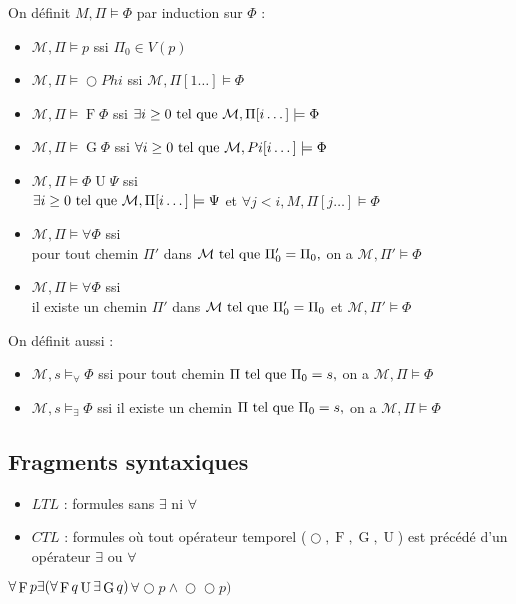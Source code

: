 \documentclass[10pt,a4paper]{article}
\newcommand{\M}{\mathcal{M}}
\DeclareMathOperator{\Oo}{\bigcirc}
\DeclareMathOperator{\Fo}{F}
\DeclareMathOperator{\Go}{G}
\DeclareMathOperator{\Uo}{U}
\begin{document}
\begin{definition}
 On définit $M, \Pi \models \Phi$ par induction sur $\Phi$ :
\begin{itemize}
 \item $\M, \Pi \models p$ ssi $\Pi_0 \in V(p)$
 \item $\M, \Pi \models  \Oo Phi$ ssi $\M, \Pi [ 1 \dots ] \models \Phi$
 \item $\M, \Pi \models \Fo \Phi$ ssi $\exists i \geq 0 \tq \M, \Pi [ i \dots ] \models \Phi$
 \item $\M, \Pi \models \Go \Phi$ ssi $\forall i \geq 0 \tq \M, Pi [ i \dots ] \models \Phi$
 \item $\M, \Pi \models \Phi \Uo \Psi$ ssi \\$\exists i \geq 0 \tq \M, \Pi [ i \dots ] \models \Psi$ et $\forall j < i, M, \Pi[j \dots] \models \Phi$
 \item $\M, \Pi \models \forall \Phi$ ssi \\pour tout chemin $\Pi'$ dans $\M \tq \Pi'_0 = \Pi_0,$ on a $\M, \Pi' \models \Phi$
 \item $\M, \Pi \models \forall \Phi$ ssi \\il existe un chemin $\Pi'$ dans $\M \tq \Pi'_0 = \Pi_0$ et $\M, \Pi' \models \Phi$
\end{itemize}
On définit aussi :
\begin{itemize}
 \item $\M, s \models_{\forall} \Phi$ ssi pour tout chemin $\Pi \text{ tel que } \Pi_0 = s,$ on a $\M, \Pi \models \Phi$
 \item $\M, s \models_{\exists} \Phi$ ssi il existe un chemin $\Pi \text{ tel que } \Pi_0 = s,$ on a $\M, \Pi \models \Phi$
\end{itemize}

\end{definition}

\subsection{Fragments syntaxiques}
\begin{itemize}
 \item $LTL$ : formules sans $\exists$ ni $\forall$
 \item $CTL$ : formules où tout opérateur temporel ($  \Oo, \Fo, \Go, \Uo$) est précédé d'un opérateur $\exists$ ou $\forall$
\end{itemize}
\begin{ex}
 $\forall \Fo p \exists ( \forall \Fo q \Uo \exists \Go q)\\
 $\st{$ \forall  \Oo p \wedge  \Oo  \Oo p)$}
\end{ex}
\end{document}
